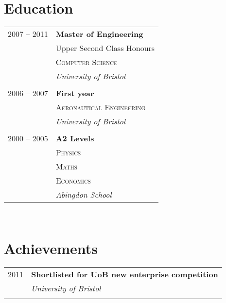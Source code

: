 \documentclass[10pt]{article} %
\begin{document}
{\begin{minipage}[t]{0.44\textwidth}

\section{Education} 

\begin{tabular}{rl} %

2007 -- 2011 & \textbf{Master of Engineering} \\ 
& \small Upper Second Class Honours \\
& \textsc{Computer Science} \\ 
& \textit{University of Bristol}\\
&\\

2006 -- 2007 & \textbf{First year}\\
& \textsc{Aeronautical Engineering} \\
& \textit{University of Bristol}\\
&\\

2000 -- 2005 & \textbf{A2 Levels}\\
& \textsc{Physics} \\
& \textsc{Maths} \\
& \textsc{Economics} \\
& \textit{Abingdon School} 
	

\end{tabular}\\[10pt]


\section{Achievements}

\begin{tabular}{rl}
2011	 & \textbf{Shortlisted for UoB new enterprise competition}\\
& \textit{University of Bristol}\\ \\


\end{tabular}
\end{minipage}}
\end{document}

